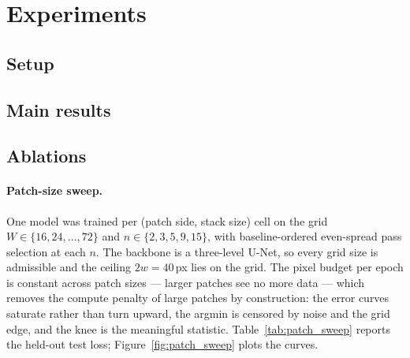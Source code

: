 \section{Experiments}
\label{sec:experiments}

\subsection{Setup}
\label{sec:experiments_setup}



\subsection{Main results}
\label{sec:experiments_main}


\subsection{Ablations}
\label{sec:experiments_ablations}


\paragraph{Patch-size sweep.}
One model was trained per (patch side, stack size) cell on the grid $W \in \{16, 24, \ldots, 72\}$ and $n \in \{2, 3, 5, 9, 15\}$, with baseline-ordered even-spread pass selection at each $n$. The backbone is a three-level U-Net, so every grid size is admissible and the ceiling $2w = 40$\,px lies on the grid. The pixel budget per epoch is constant across patch sizes --- larger patches see no more data --- which removes the compute penalty of large patches by construction: the error curves saturate rather than turn upward, the argmin is censored by noise and the grid edge, and the knee is the meaningful statistic. Table~\ref{tab:patch_sweep} reports the held-out test loss; Figure~\ref{fig:patch_sweep} plots the curves.

